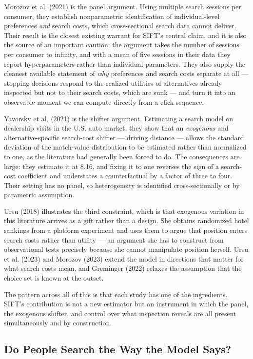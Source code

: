 \documentclass[
  letterpaper,
  DIV=11,
  numbers=noendperiod]{scrartcl}
\begin{document}
Morozov et al. (2021) is the panel argument. Using multiple search
sessions per consumer, they establish nonparametric identification of
individual-level preferences \emph{and} search costs, which
cross-sectional search data cannot deliver. Their result is the closest
existing warrant for SIFT's central claim, and it is also the source of
an important caution: the argument takes the number of sessions per
consumer to infinity, and with a mean of five sessions in their data
they report hyperparameters rather than individual parameters. They also
supply the cleanest available statement of \emph{why} preferences and
search costs separate at all --- stopping decisions respond to the
realized utilities of alternatives already inspected but not to their
search costs, which are sunk --- and turn it into an observable moment
we can compute directly from a click sequence.

Yavorsky et al. (2021) is the shifter argument. Estimating a search
model on dealership visits in the U.S. auto market, they show that an
\emph{exogenous} and alternative-specific search-cost shifter ---
driving distance --- allows the standard deviation of the match-value
distribution to be estimated rather than normalized to one, as the
literature had generally been forced to do. The consequences are large:
they estimate it at 8.16, and fixing it to one reverses the sign of a
search-cost coefficient and understates a counterfactual by a factor of
three to four. Their setting has no panel, so heterogeneity is
identified cross-sectionally or by parametric assumption.

Ursu (2018) illustrates the third constraint, which is that exogenous
variation in this literature arrives as a gift rather than a design. She
obtains randomized hotel rankings from a platform experiment and uses
them to argue that position enters search costs rather than utility ---
an argument she has to construct from observational tests precisely
because she cannot manipulate position herself. Ursu et al. (2023) and
Morozov (2023) extend the model in directions that matter for what
search costs mean, and Greminger (2022) relaxes the assumption that the
choice set is known at the outset.

The pattern across all of this is that each study has one of the
ingredients. SIFT's contribution is not a new estimator but an
instrument in which the panel, the exogenous shifter, and control over
what inspection reveals are all present simultaneously and by
construction.

\subsection{Do People Search the Way the Model Says?}\label{sec-lit-lab}
\end{document}
